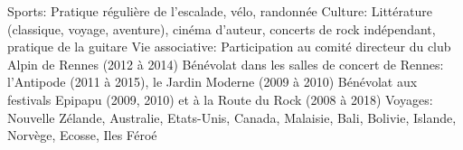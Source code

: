 \begin{cvskills}
  \cvskill
    {Sports:}
	{Pratique régulière de l'escalade, vélo, randonnée}
  \cvskill
    {Culture:}
	{
        Littérature (classique, voyage, aventure), cinéma d'auteur, concerts de
        rock indépendant, pratique de la guitare
	}
  \cvskill
    {Vie associative:}
	{
		Participation au comité directeur du club Alpin de Rennes (2012 à 2014)
		\newline
		Bénévolat dans les salles de concert de Rennes: l'Antipode (2011 à 2015),
		le Jardin Moderne (2009 à 2010) \lastnewline
        Bénévolat aux festivals Epipapu (2009, 2010) et à la Route du Rock
        (2008 à 2018)
    }
  \cvskill
    {Voyages:}
    {Nouvelle Zélande, Australie, Etats-Unis, Canada, Malaisie, Bali, Bolivie,
    Islande, Norvège, Ecosse, Iles Féroé}
\end{cvskills}
